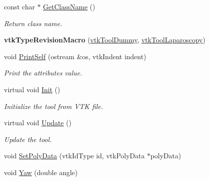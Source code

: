 \begin{DoxyCompactItemize}
\item 
\hypertarget{classvtkToolDummy_a7e647f03fad14d87b9f9ee9fb793d664}{
const char $\ast$ \hyperlink{classvtkToolDummy_a7e647f03fad14d87b9f9ee9fb793d664}{GetClassName} ()}
\label{classvtkToolDummy_a7e647f03fad14d87b9f9ee9fb793d664}

\begin{DoxyCompactList}\small\item\em Return class name. \item\end{DoxyCompactList}\item 
\hypertarget{classvtkToolDummy_acaaa2e036bc347ffae575d818fbc943f}{
{\bfseries vtkTypeRevisionMacro} (\hyperlink{classvtkToolDummy}{vtkToolDummy}, \hyperlink{classvtkToolLaparoscopy}{vtkToolLaparoscopy})}
\label{classvtkToolDummy_acaaa2e036bc347ffae575d818fbc943f}

\item 
\hypertarget{classvtkToolDummy_abfdf88480ec5e4abd7046b36549cc0f6}{
void \hyperlink{classvtkToolDummy_abfdf88480ec5e4abd7046b36549cc0f6}{PrintSelf} (ostream \&os, vtkIndent indent)}
\label{classvtkToolDummy_abfdf88480ec5e4abd7046b36549cc0f6}

\begin{DoxyCompactList}\small\item\em Print the attributes value. \item\end{DoxyCompactList}\item 
virtual void \hyperlink{classvtkToolDummy_aaf4c69a9c0fc3432e678ca9fffc913dc}{Init} ()
\begin{DoxyCompactList}\small\item\em Initialize the tool from VTK file. \item\end{DoxyCompactList}\item 
virtual void \hyperlink{classvtkToolDummy_a19cda726ffda0a3955e519d7b42e4882}{Update} ()
\begin{DoxyCompactList}\small\item\em Update the tool. \item\end{DoxyCompactList}\item 
void \hyperlink{classvtkToolDummy_a3170be76c18a7507cb6014fc49123919}{SetPolyData} (vtkIdType id, vtkPolyData $\ast$polyData)
\item 
\hypertarget{classvtkToolDummy_ae5dce01d7d7cf21ca321d0899531cc1c}{
void \hyperlink{classvtkToolDummy_ae5dce01d7d7cf21ca321d0899531cc1c}{Yaw} (double angle)}
\label{classvtkToolDummy_ae5dce01d7d7cf21ca321d0899531cc1c}


\end{DoxyCompactItemize}
